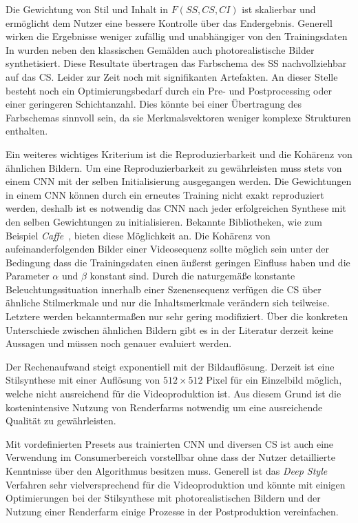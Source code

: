 \documentclass[times, 11pt,twocolumn]{article}
\begin{document}
Die Gewichtung von Stil und Inhalt in $F (SS,CS,CI)$ ist skalierbar und ermöglicht dem Nutzer eine bessere Kontrolle über das Endergebnis. Generell wirken die Ergebnisse weniger zufällig und unabhängiger von den Trainingsdaten In \cite{McCaigDG16} wurden neben den klassischen Gemälden auch photorealistische Bilder synthetisiert. Diese Resultate übertragen das Farbschema des SS nachvollziehbar auf das CS. Leider zur Zeit noch mit signifikanten Artefakten. An dieser Stelle besteht noch ein Optimierungsbedarf durch ein Pre- und Postprocessing oder einer geringeren Schichtanzahl. Dies könnte bei einer Übertragung des Farbschemas sinnvoll sein, da sie Merkmalsvektoren weniger komplexe Strukturen enthalten.

Ein weiteres wichtiges Kriterium ist die Reproduzierbarkeit und die Kohärenz von ähnlichen Bildern. Um eine Reproduzierbarkeit zu gewährleisten muss stets von einem CNN mit der selben Initialisierung ausgegangen werden. Die Gewichtungen in einem CNN können durch ein erneutes Training nicht exakt reproduziert werden, deshalb ist es notwendig das CNN nach jeder erfolgreichen Synthese mit den selben Gewichtungen zu initialisieren. Bekannte Bibliotheken, wie zum Beispiel \textit{Caffe}~\cite{JiaCaffe}, bieten diese Möglichkeit an.
Die Kohärenz von aufeinanderfolgenden Bilder einer Videosequenz sollte möglich sein unter der Bedingung dass die Trainingsdaten einen äußerst geringen Einfluss haben und die Parameter $\alpha$ und $\beta$ konstant sind. Durch die naturgemäße konstante Beleuchtungssituation innerhalb einer Szenensequenz verfügen die CS über ähnliche Stilmerkmale und nur die Inhaltsmerkmale verändern sich teilweise. Letztere werden bekanntermaßen nur sehr gering modifiziert. Über die konkreten Unterschiede zwischen ähnlichen Bildern gibt es in der Literatur derzeit keine Aussagen und müssen noch genauer evaluiert werden.

Der Rechenaufwand steigt exponentiell mit der Bildauflösung. Derzeit ist eine Stilsynthese mit einer Auflösung von $512\times512$ Pixel für ein Einzelbild möglich, welche nicht ausreichend für die Videoproduktion ist. Aus diesem Grund ist die kostenintensive Nutzung von Renderfarms notwendig um eine ausreichende Qualität zu gewährleisten.

Mit vordefinierten Presets aus trainierten CNN und diversen CS ist auch eine Verwendung im Consumerbereich vorstellbar ohne dass der Nutzer detaillierte Kenntnisse über den Algorithmus besitzen muss. Generell ist das \textit{Deep Style} Verfahren sehr vielversprechend für die Videoproduktion und könnte mit einigen Optimierungen bei der Stilsynthese mit photorealistischen Bildern und der Nutzung einer Renderfarm einige Prozesse in der Postproduktion vereinfachen. 
\end{document}
